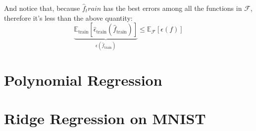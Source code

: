 \documentclass[]{article}
\begin{document}
        And notice that, because $\hat{f}_train$ has the best errors among all the functions in $\mathcal{F}$, therefore it's less than the above quantity: 
        \begin{equation*}\tag{A.3.b.5}\label{eqn:A.3.b.5}
            \underbrace{\mathbb{E}_\text{train} 
            \left[\hat{\epsilon}_\text{train}(\hat{f}_\text{train})\right]}_{\epsilon(\hat{f}_\text{train})}
            \le 
            \mathbb{E}_\mathcal{F}\left[\epsilon(f)\right]
        \end{equation*}

\section*{Polynomial Regression}

\section*{Ridge Regression on MNIST}
\end{document}
